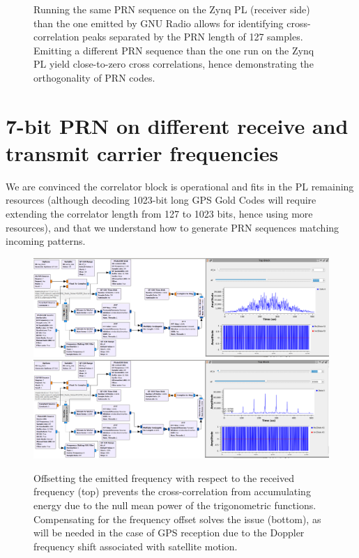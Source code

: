 \documentclass{article}
\begin{document}
\begin{figure}[h!tb]
\caption{Running the same PRN sequence on the Zynq PL (receiver side) than the one emitted by 
GNU Radio
allows for identifying cross-correlation peaks separated by the PRN length of 127 samples. Emitting a
different PRN sequence than the one run on the Zynq PL yield close-to-zero cross correlations, hence
demonstrating the orthogonality of PRN codes.}
\label{f2}
\end{figure}

\section{7-bit PRN on different receive and transmit carrier frequencies}

We are convinced the correlator block is operational and fits in the PL remaining resources (although
decoding 1023-bit long GPS Gold Codes will require extending the correlator length from 127 to 1023 bits,
hence using more resources), and that we understand how to generate PRN sequences matching incoming patterns.

\begin{figure}[h!tb]
\includegraphics[width=\linewidth]{xcorr_pluto3ng.png}
\includegraphics[width=\linewidth]{xcorr_pluto3g.png}
\caption{Offsetting the emitted frequency with respect to the received frequency (top) prevents
the cross-correlation from accumulating energy due to the null mean power of the trigonometric
functions. Compensating for the frequency offset solves the issue (bottom), as will be needed
in the case of GPS reception due to the Doppler frequency shift associated with satellite motion.}
\label{f3}
\end{figure}
\end{document}
